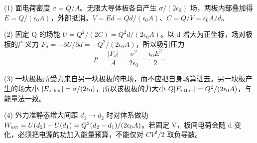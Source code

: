 (1) 面电荷密度 \(\sigma=Q/A\)。无限大导体板各自产生 \(\sigma/(2\epsilon_0)\) 场，两板内部叠加得 \(E=Q/(\epsilon_0 A)\)，外部抵消。\(V=Ed=Qd/(\epsilon_0A)\)、\(C=Q/V=\epsilon_0 A/d\)。

(2) 固定 Q 的场能 \(U=Q^2/(2C)=Q^2d/(2\epsilon_0 A)\)。以 d 增大为正坐标，场对极板的广义力 \(F_d=-\partial U/\partial d=-Q^2/(2\epsilon_0 A)\)，所以吸引压力
\[
p=\frac{|F_d|}{A}=\frac{\sigma^2}{2\epsilon_0}=\frac{\epsilon_0E^2}{2}.
\]

(3) 一块极板所受力来自另一块极板的电场，而不应把自身场算进去。另一块板产生的场大小 \(|E_{\rm other}|=\sigma/(2\epsilon_0)\)，所以该极板的力大小 \(Q|E_{\rm other}|=Q^2/(2\epsilon_0A)\)，与能量法一致。

(4) 外力准静态增大间距 \(d_1\to d_2\) 时对体系做功 \(W_{\rm ext}=U(d_2)-U(d_1)=Q^2(d_2-d_1)/(2\epsilon_0A)\)。若固定 V，板间电荷会随 d 变化，必须把电源的功加入能量预算，不能仅对 \(CV^2/2\) 取负导数。
